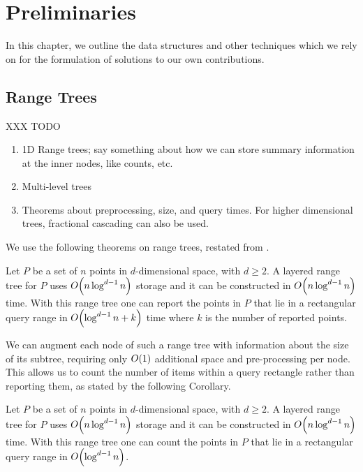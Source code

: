\chapter{Preliminaries}
\label{:prelim}

In this chapter, we outline the data structures and other techniques which we rely on for the formulation of solutions to our own contributions.

\section{Range Trees}
\label{:prelim:range-trees}

XXX TODO

\begin{enumerate}
 \item 1D Range trees; say something about how we can store summary information at the inner nodes, like counts, etc.
 \item Multi-level trees
 \item Theorems about preprocessing, size, and query times.  For higher dimensional trees, fractional cascading can also be used.
\end{enumerate}

We use the following theorems on range trees, restated from \cite{debergch5}.

\begin{theorem}
\label{th:rangetree}
Let $P$ be a set of $n$ points in $d$-dimensional space, with $d \geq 2$. A layered range tree for $P$ uses $O\!\left(n \log^{d-1}{n}\right)$ storage and it can be constructed in $O\!\left(n \log^{d-1}{n}\right)$ time. With this range tree one can report the points in $P$ that lie in a rectangular query range in $O\!\left(\log^{d-1}{n} + k\right)$ time where $k$ is the number of reported points.
\end{theorem}

We can augment each node of such a range tree with information about the size of its subtree, requiring only $O\!\left(1\right)$ additional space and pre-processing per node.  This allows us to count the number of items within a query rectangle rather than reporting them, as stated by the following Corollary.

\begin{corollary}
\label{cor:rangetree}
Let $P$ be a set of $n$ points in $d$-dimensional space, with $d \geq 2$. A layered range tree for $P$ uses $O\!\left(n \log^{d-1}{n}\right)$ storage and it can be constructed in $O\!\left(n \log^{d-1}{n}\right)$ time. With this range tree one can count the points in $P$ that lie in a rectangular query range in $O\!\left(\log^{d-1}{n}\right)$.
\end{corollary}


